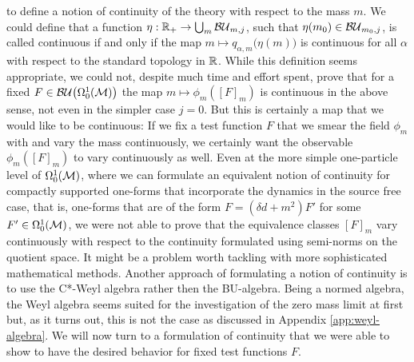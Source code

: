 to define a notion of continuity of the theory with respect to the mass $m$. We could define that a function $\eta: \mathbb{R}_+ \to \bigcup_m {\mathcal{BU}_{m,j}}$, such that $\eta(m_0) \in \mathcal{BU}_{m_0,j}$, is called continuous if and only if the map $m \mapsto q_{\alpha,m}\big(\eta(m)\big)$ is continuous for all $\alpha$ with respect to the standard topology in $\mathbb{R}$. While this definition seems appropriate, we could not, despite much time and effort spent, prove that for a fixed $F \in {\mathcal{BU}\big(\Omega^1_0(\ensuremath{\mathcal{M}})\big)}$ the map $m \mapsto \phi_m([F]_m)$ is continuous in the above sense, not even in the simpler case $j=0$. But this is certainly a map that we would like to be continuous: If we fix a test function $F$ that we smear the field $\phi_m$ with and vary the mass continuously, we certainly want the observable $\phi_m([F]_m)$ to vary continuously as well. Even at the more simple one-particle level of $\Omega^1_0(\mathcal{M})$, where we can formulate an equivalent notion of continuity for compactly supported one-forms that incorporate the dynamics in the source free case, that is, one-forms that are of the form $F= (\delta d +m^2)F'$ for some $F' \in \Omega^1_0(\mathcal{M})$, we were not able to prove that the equivalence classes $[F]_m$ vary continuously with respect to the continuity formulated using semi-norms on the quotient space. It might be a problem worth tackling with more sophisticated mathematical methods. Another approach of formulating a notion of continuity is to use the C*-Weyl algebra rather then the BU-algebra. Being a normed algebra, the Weyl algebra seems suited for the investigation of the zero mass limit at first but, as it turns out, this is not the case as discussed in Appendix \ref{app:weyl-algebra}.
We will now turn to a formulation of continuity that we were able to show to have the desired behavior for fixed test functions $F$.
%
%
%
%
%
%
%
